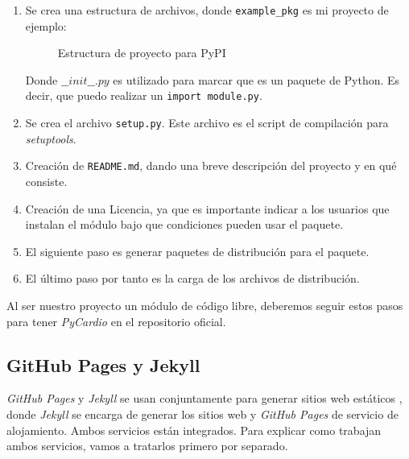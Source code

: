 \begin{enumerate}
    \item Se crea una estructura de archivos, donde \texttt{example\_pkg} es mi proyecto de ejemplo:
     \begin{figure}[h]
     \centering
     \caption{Estructura de proyecto para PyPI}
     \label{fig:dirPyPi}
     \end{figure}
      Donde \texttt{$\_\_init\_\_.py$} es utilizado para marcar que  es un paquete de Python. Es decir, que puedo realizar un \texttt{import module.py}.
    \item Se crea el archivo \texttt{setup.py}. Este archivo es el script de compilación para \emph{setuptools}.
    \item Creación de \texttt{README.md}, dando una breve descripción del proyecto y en qué consiste.
    \item Creación de una Licencia, ya que es importante indicar a los usuarios que instalan el módulo bajo que condiciones pueden usar el paquete.
    \item El siguiente paso es generar paquetes de distribución para el paquete.
    \item El último paso por tanto es la carga de los archivos de distribución.
\end{enumerate}
Al ser nuestro proyecto un módulo de código libre, deberemos seguir estos pasos para tener \emph{PyCardio} en el repositorio
oficial.

\subsection{GitHub Pages y Jekyll}
\label{subsec:githubJekyll}
\emph{GitHub Pages} y \emph{Jekyll} se usan conjuntamente para generar sitios web estáticos , donde \emph{Jekyll} se encarga de generar los sitios web y \emph{GitHub Pages} de servicio de alojamiento. Ambos servicios están integrados. Para explicar como trabajan ambos servicios, vamos a tratarlos primero por separado.


